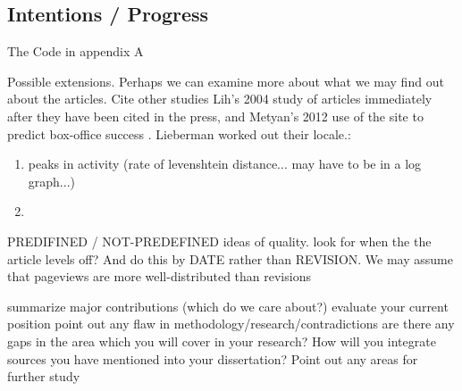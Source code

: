 \documentclass[a4paper,11pt,twoside,notitlepage]{article}
\begin{document}
        \subsection{Intentions / Progress}
        The Code in appendix A
        
        Possible extensions.  Perhaps we can examine more about what
        we may find out about the articles. Cite other studies Lih's
        2004 study of articles immediately after they have been cited
        in the press\cite{Lih2004}, and Metyan's 2012 use of the site
        to predict box-office success \cite{Mestyan2012}. Lieberman
        worked out their locale.\cite{Lieberman2009}:

        \begin{enumerate}
          \item peaks in activity (rate of levenshtein distance... may
            have to be in a log graph...)
          \item 
        \end{enumerate}

        PREDIFINED / NOT-PREDEFINED ideas of quality. look for when
        the the article levels off? And do this by DATE rather than
        REVISION. We may assume that pageviews are more
        well-distributed than revisions

        summarize major contributions (which do we care about?)
        evaluate your current position point out any flaw in
        methodology/research/contradictions are there any gaps in the
        area which you will cover in your research?  How will you
        integrate sources you have mentioned into your dissertation?
        Point out any areas for further study
\end{document}
